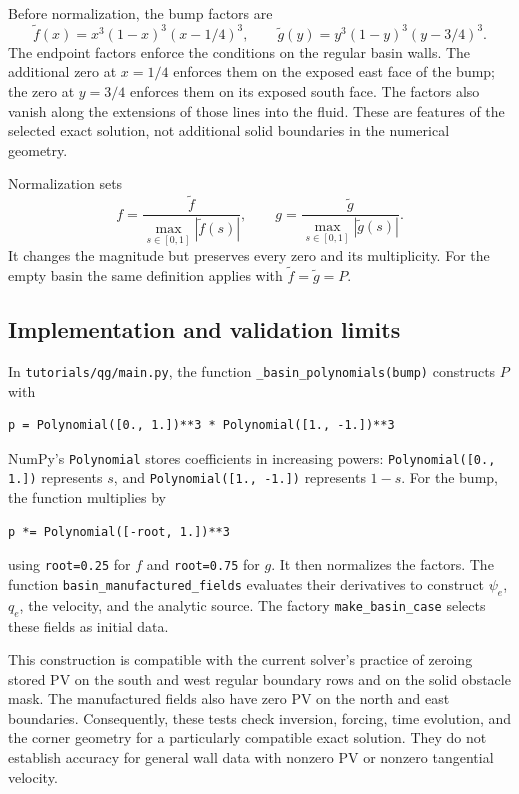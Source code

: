 \documentclass[11pt]{article}
\begin{document}
Before normalization, the bump factors are
\[
 \widetilde f(x)=x^3(1-x)^3(x-1/4)^3,\qquad
 \widetilde g(y)=y^3(1-y)^3(y-3/4)^3.
\]
The endpoint factors enforce the conditions on the regular basin walls.
The additional zero at $x=1/4$ enforces them on the exposed east face of
the bump; the zero at $y=3/4$ enforces them on its exposed south face.
The factors also vanish along the extensions of those lines into the
fluid.  These are features of the selected exact solution, not additional
solid boundaries in the numerical geometry.

Normalization sets
\[
 f=\frac{\widetilde f}{\max_{s\in[0,1]}|\widetilde f(s)|},
 \qquad
 g=\frac{\widetilde g}{\max_{s\in[0,1]}|\widetilde g(s)|}.
\]
It changes the magnitude but preserves every zero and its multiplicity.
For the empty basin the same definition applies with
$\widetilde f=\widetilde g=P$.

\subsection{Implementation and validation limits}

In \texttt{tutorials/qg/main.py}, the function
\texttt{\_basin\_polynomials(bump)} constructs $P$ with
\begin{verbatim}
p = Polynomial([0., 1.])**3 * Polynomial([1., -1.])**3
\end{verbatim}
NumPy's \texttt{Polynomial} stores coefficients in increasing powers:
\texttt{Polynomial([0., 1.])} represents $s$, and
\texttt{Polynomial([1., -1.])} represents $1-s$.
For the bump, the function multiplies by
\begin{verbatim}
p *= Polynomial([-root, 1.])**3
\end{verbatim}
using \texttt{root=0.25} for $f$ and \texttt{root=0.75} for $g$.
It then normalizes the factors.
The function \texttt{basin\_manufactured\_fields} evaluates their
derivatives to construct $\psi_e$, $q_e$, the velocity, and the analytic
source.  The factory \texttt{make\_basin\_case} selects these fields as
initial data.

This construction is compatible with the current solver's practice of
zeroing stored PV on the south and west regular boundary rows and on
the solid obstacle mask.  The manufactured fields also have zero PV on
the north and east boundaries.  Consequently, these tests check inversion,
forcing, time evolution, and the corner geometry for a particularly
compatible exact solution.  They do not establish accuracy for general
wall data with nonzero PV or nonzero tangential velocity.
\end{document}
